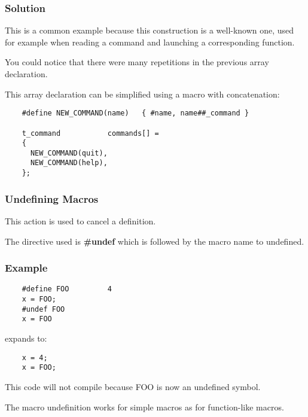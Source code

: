 \begin{frame}[containsverbatim]
  \frametitle{Solution}

  This is a common example because this construction is a well-known one,
  used for example when reading a command and launching a corresponding
  function.

  \nl

  You could notice that there were many repetitions in the previous
  array declaration.

  \nl

  This array declaration can be simplified using a macro with concatenation:

  \begin{verbatim}
    #define NEW_COMMAND(name)   { #name, name##_command }

    t_command           commands[] =
    {
      NEW_COMMAND(quit),
      NEW_COMMAND(help),
    };
  \end{verbatim}
\end{frame}


\begin{frame}
  \frametitle{Undefining Macros}

  This action is used to cancel a definition.

  \nl

  The directive used is \textbf{\#undef} which is followed by the macro
  name to undefined.
\end{frame}


\begin{frame}[containsverbatim]
  \frametitle{Example}

  \begin{verbatim}
    #define FOO         4
    x = FOO;
    #undef FOO
    x = FOO
  \end{verbatim}

  expands to:

  \begin{verbatim}
    x = 4;
    x = FOO;
  \end{verbatim}

  This code will not compile because FOO is now an undefined symbol.

  \nl

  The macro undefinition works for simple macros as for function-like macros.
\end{frame}


